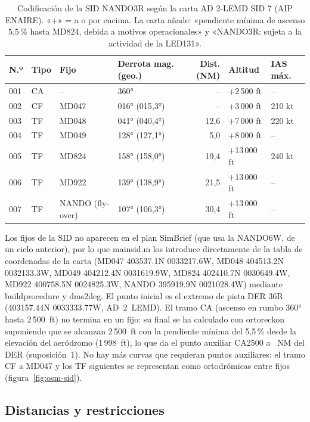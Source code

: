 \documentclass[11pt,a4paper]{article}
\DeclareRobustCommand{\m}[1]{{\ttfamily\def\_{\textunderscore\penalty100\relax}#1}}
\begin{document}
\begin{table}[H]\centering\small
\begin{tabular}{llllrll}\toprule
N.º & Tipo & Fijo & Derrota mag. (geo.) & Dist. (NM) & Altitud & IAS máx.\\ \midrule
001 & CA & -- & 360° & -- & +2\,500 ft & --\\
002 & CF & MD047 & 016° (015,3°) & -- & +3\,000 ft & 210 kt\\
003 & TF & MD048 & 041° (040,4°) & 12,6 & +7\,000 ft & 220 kt\\
004 & TF & MD049 & 128° (127,1°) & 5,0 & +8\,000 ft & --\\
005 & TF & MD824 & 158° (158,0°) & 19,4 & +13\,000 ft & 240 kt\\
006 & TF & MD922 & 139° (138,9°) & 21,5 & +13\,000 ft & --\\
007 & TF & NANDO (fly-over) & 107° (106,3°) & 30,4 & +13\,000 ft & --\\ \bottomrule
\end{tabular}
\caption{Codificación de la SID NANDO3R según la carta AD 2-LEMD SID 7 (AIP ENAIRE). «+» = a o por encima. La carta añade: «pendiente mínima de ascenso 5,5\,\% hasta MD824, debida a motivos operacionales» y «NANDO3R: sujeta a la actividad de la LED131».}
\label{tab:sidcarta}
\end{table}

Los fijos de la SID no aparecen en el plan SimBrief (que usa la NANDO6W, de un ciclo anterior), por lo que \m{main\_sid.m} los introduce directamente de la tabla de coordenadas de la carta (MD047 403537.1N 0033217.6W, MD048 404513.2N 0032133.3W, MD049 404212.4N 0031619.9W, MD824 402410.7N 0030649.4W, MD922 400758.5N 0024825.3W, NANDO 395919.9N 0021028.4W) mediante \m{build\_procedure} y \m{dms2deg}. El punto inicial es el extremo de pista DER 36R (403157.44N 0033333.77W, AD~2~LEMD). El tramo CA (ascenso en rumbo 360° hasta 2\,500~ft) no termina en un fijo: su final se ha calculado con \m{orto\_reckon} suponiendo que se alcanzan 2\,500~ft con la pendiente mínima del 5,5\,\% desde la elevación del aeródromo (1\,998~ft), lo que da el punto auxiliar CA2500 a \sidCA~NM del DER (suposición~1). No hay más curvas que requieran puntos auxiliares: el tramo CF a MD047 y los TF siguientes se representan como ortodrómicas entre fijos (figura~\ref{fig:osm-sid}).

\subsection{Distancias y restricciones}
\end{document}
